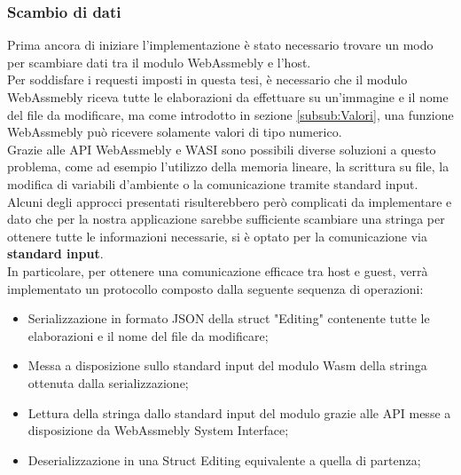 \subsubsection{Scambio di dati}
Prima ancora di iniziare l'implementazione è stato necessario trovare un modo per scambiare dati tra il modulo WebAssmebly e l'host.
\\Per soddisfare i requesti imposti in questa tesi, è necessario che il modulo WebAssmebly riceva tutte le elaborazioni da effettuare su un'immagine e il nome del file da modificare, ma come introdotto in sezione \ref{subsub:Valori}, una funzione WebAssmebly può ricevere solamente valori di tipo numerico.
\\Grazie alle API WebAssmebly e WASI sono possibili diverse soluzioni a questo problema, come ad esempio l'utilizzo della memoria lineare, la scrittura su file, la modifica di variabili d'ambiente o la comunicazione tramite standard input.
Alcuni degli approcci presentati risulterebbero però complicati da implementare e dato che per la nostra applicazione sarebbe sufficiente scambiare una stringa per ottenere tutte le informazioni necessarie, si è optato per la comunicazione via \textbf{standard input}.
\\In particolare, per ottenere una comunicazione efficace tra host e guest, verrà implementato un protocollo composto dalla seguente sequenza di operazioni:
\begin{itemize}
    \item Serializzazione in formato JSON della struct "Editing" contenente tutte le elaborazioni  e il nome del file da modificare;
    \item Messa a disposizione sullo standard input del modulo Wasm della stringa ottenuta dalla serializzazione;
    \item Lettura della stringa dallo standard input del modulo  grazie alle API messe a disposizione da WebAssmebly System Interface;
    \item Deserializzazione in una Struct Editing equivalente a quella di partenza;
\end{itemize}
